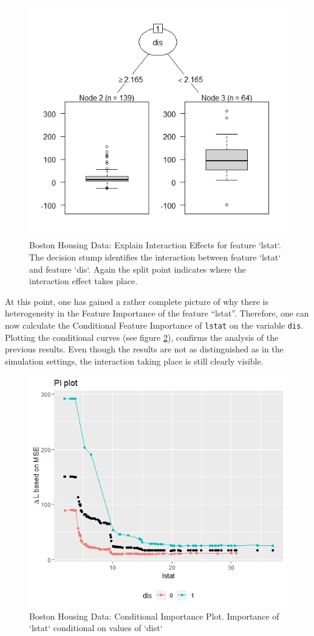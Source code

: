 \documentclass[]{krantz}
\begin{document}
\begin{figure}

{\centering \includegraphics[width=0.7\linewidth]{images/03-7-RD3} 

}

\caption{Boston Housing Data: Explain Interaction Effects for feature `lstat`. The decision stump identifies the interaction between feature `lstat` and feature `dis`. Again the split point indicates where the interaction effect takes place.}\label{fig:fig11}
\end{figure}

At this point, one has gained a rather complete picture of why there is
heterogeneity in the Feature Importance of the feature ``lstat''.
Therefore, one can now calculate the Conditional Feature Importance of
\texttt{lstat} on the variable \texttt{dis}. Plotting the conditional
curves (see figure \ref{fig:fig12}), confirms the analysis of the
previous results. Even though the results are not as distinguished as in
the simulation settings, the interaction taking place is still clearly
visible.

\begin{figure}

{\centering \includegraphics[width=0.75\linewidth]{images/03-7-RD4} 

}

\caption{Boston Housing Data: Conditional Importance Plot. Importance of `lstat` conditional on values of `dist`}\label{fig:fig12}
\end{figure}
\end{document}
